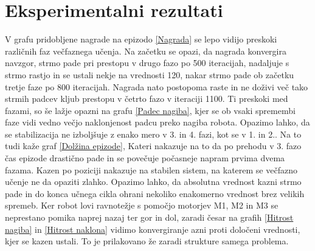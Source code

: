 \section{Eksperimentalni rezultati}
  V grafu pridobljene nagrade na epizodo \ref{Nagrada} se lepo vidijo preskoki različnih faz večfaznega učenja. Na začetku se opazi, da nagrada konvergira navzgor, strmo pade pri prestopu v drugo fazo po 500 iteracijah, nadaljuje s strmo rastjo in se ustali nekje na vrednosti 120, nakar strmo pade ob začetku tretje faze po 800 iteracijah. Nagrada nato postopoma raste in ne doživi več tako strmih padcev kljub prestopu v četrto fazo v iteraciji 1100. Ti preskoki med fazami, so še lažje opazni na grafu \ref{Padec nagiba}, kjer se ob vsaki spremembi faze vidi vedno večjo naklonjenost padcu preko nagiba robota. Opazimo lahko, da se stabilizacija ne izboljšuje z enako mero v 3. in 4. fazi, kot se v 1. in 2.. Na to tudi kaže graf \ref{Dolžina epizode}, Kateri nakazuje na to da po prehodu v 3. fazo čas epizode drastično pade in se povečuje počasneje napram prvima dvema fazama.
Kazen po poziciji nakazuje na stabilen sistem, na katerem se večfazno učenje ne da opaziti zlahko. Opazimo lahko, da absolutna vrednost kazni strmo pade in do konca učnega cikla ohrani nekoliko enakomerno vrednost brez velikih spremeb. 
  Ker robot lovi ravnotežje s pomočjo motorjev M1, M2 in M3 se neprestano pomika naprej nazaj ter gor in dol, zaradi česar na grafih \ref{Hitrost nagiba} in \ref{Hitrost naklona} vidimo konvergiranje azni proti določeni vrednosti, kjer se kazen ustali. To je prilakovano že zaradi strukture samega problema.
  
  